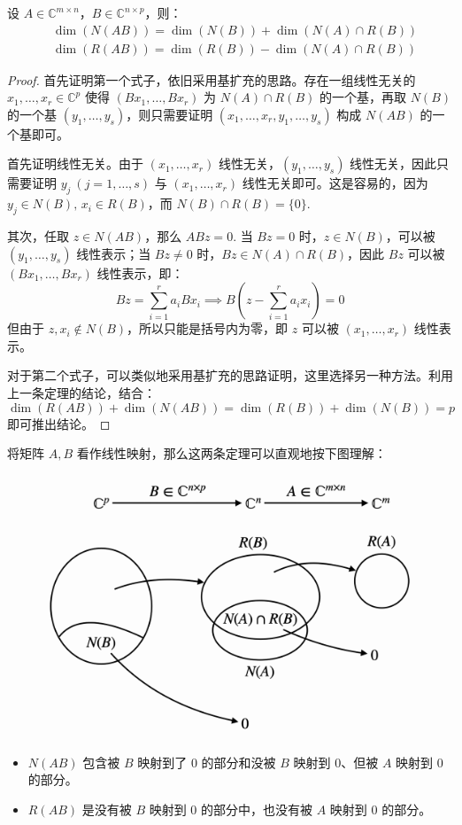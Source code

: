 \begin{theorem}[线性映射复合的维数公式]
设 $A\in\mathbb C^{m\times n}$，$B\in\mathbb C^{n\times p}$，则：
\begin{align*}
    &\dim(N(AB))=\dim(N(B))+\dim(N(A)\cap R(B))\\
    &\dim(R(AB))=\dim(R(B))-\dim(N(A)\cap R(B))
\end{align*}
\end{theorem}
\begin{proof}
首先证明第一个式子，依旧采用基扩充的思路。存在一组线性无关的 $x_1,\ldots,x_r\in\mathbb C^p$ 使得 $(Bx_1,\ldots,Bx_r)$ 为 $N(A)\cap R(B)$ 的一个基，再取 $N(B)$ 的一个基 $(y_1,\ldots,y_s)$，则只需要证明 $(x_1,\ldots,x_r,y_1,\ldots,y_s)$ 构成 $N(AB)$ 的一个基即可。

首先证明线性无关。由于 $(x_1,\ldots,x_r)$ 线性无关，$(y_1,\ldots,y_s)$ 线性无关，因此只需要证明 $y_j\ (j=1,\ldots,s)$ 与 $(x_1,\ldots,x_r)$ 线性无关即可。这是容易的，因为 $y_j\in N(B),\,x_i\in R(B)$，而 $N(B)\cap R(B)=\{0\}$.

其次，任取 $z\in N(AB)$，那么 $ABz=0$.  当 $Bz=0$ 时，$z\in N(B)$，可以被 $(y_1,\ldots,y_s)$ 线性表示；当 $Bz\neq 0$ 时，$Bz\in N(A)\cap R(B)$，因此 $Bz$ 可以被 $(Bx_1,\ldots,Bx_r)$ 线性表示，即：
\[
    Bz=\sum_{i=1}^r a_i Bx_i\implies B\left(z-\sum_{i=1}^ra_ix_i\right)=0
\]
但由于 $z,x_i\notin N(B)$，所以只能是括号内为零，即 $z$ 可以被 $(x_1,\ldots,x_r)$ 线性表示。

对于第二个式子，可以类似地采用基扩充的思路证明，这里选择另一种方法。利用上一条定理的结论，结合：
\[
    \dim(R(AB))+\dim(N(AB))=\dim(R(B))+\dim(N(B))=p
\]
即可推出结论。
\end{proof}

\begin{remark}
将矩阵 $A,B$ 看作线性映射，那么这两条定理可以直观地按下图理解：
\begin{figure}[H]
    \centering
    \includegraphics[width=0.55\linewidth]{figs/mapping.png}
\end{figure}
\begin{itemize}
    \item $N(AB)$ 包含被 $B$ 映射到了 $0$ 的部分和没被 $B$ 映射到 $0$、但被 $A$ 映射到 $0$ 的部分。
    \item $R(AB)$ 是没有被 $B$ 映射到 $0$ 的部分中，也没有被 $A$ 映射到 $0$ 的部分。
\end{itemize}
\end{remark}

